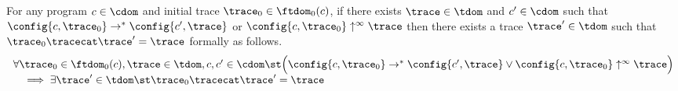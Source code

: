   \begin{lemma}
    \label{lem:tracenondec}
    For any program $c \in \cdom$ and initial trace $\trace_0 \in \ftdom_0(c)$,
    if there exists $\trace \in \tdom$ and $c' \in \cdom $ such that $\config{c, \trace_0} \rightarrow^{*} \config{c', \trace} $ or 
    $\config{c, \trace_0} \uparrow^{\infty} \trace$  
    then there exists a trace $\trace' \in \tdom$ such that $\trace_0 \tracecat \trace' = \trace$ formally as follows.
    \[
      \begin{array}{l}
      \forall \trace_0 \in \ftdom_0(c), \trace \in \tdom, c, c' \in \cdom \st
      \Big( \config{c, \trace_0} \rightarrow^{*} \config{c', \trace} 
      \lor  \config{c, \trace_0} \uparrow^{\infty} \trace \Big)
      \\ \quad
      \implies \exists \trace' \in \tdom \st \trace_0 \tracecat \trace' = \trace 
      \end{array}
    \]
\end{lemma}
